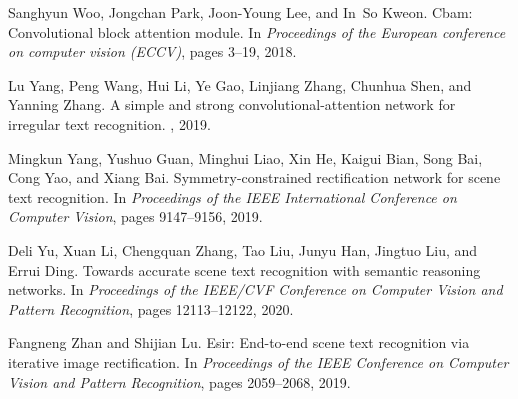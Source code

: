 \documentclass[final]{cvpr}
\begin{document}
{\begin{thebibliography}{10}
Sanghyun Woo, Jongchan Park, Joon-Young Lee, and In~So Kweon.
\newblock Cbam: Convolutional block attention module.
\newblock In {\em Proceedings of the European conference on computer vision
  (ECCV)}, pages 3--19, 2018.

Lu Yang, Peng Wang, Hui Li, Ye Gao, Linjiang Zhang, Chunhua Shen, and Yanning
  Zhang.
\newblock A simple and strong convolutional-attention network for irregular
  text recognition.
, 2019.

Mingkun Yang, Yushuo Guan, Minghui Liao, Xin He, Kaigui Bian, Song Bai, Cong
  Yao, and Xiang Bai.
\newblock Symmetry-constrained rectification network for scene text
  recognition.
\newblock In {\em Proceedings of the IEEE International Conference on Computer
  Vision}, pages 9147--9156, 2019.

Deli Yu, Xuan Li, Chengquan Zhang, Tao Liu, Junyu Han, Jingtuo Liu, and Errui
  Ding.
\newblock Towards accurate scene text recognition with semantic reasoning
  networks.
\newblock In {\em Proceedings of the IEEE/CVF Conference on Computer Vision and
  Pattern Recognition}, pages 12113--12122, 2020.

Fangneng Zhan and Shijian Lu.
\newblock Esir: End-to-end scene text recognition via iterative image
  rectification.
\newblock In {\em Proceedings of the IEEE Conference on Computer Vision and
  Pattern Recognition}, pages 2059--2068, 2019.

\end{thebibliography}
 

}
\end{document}
